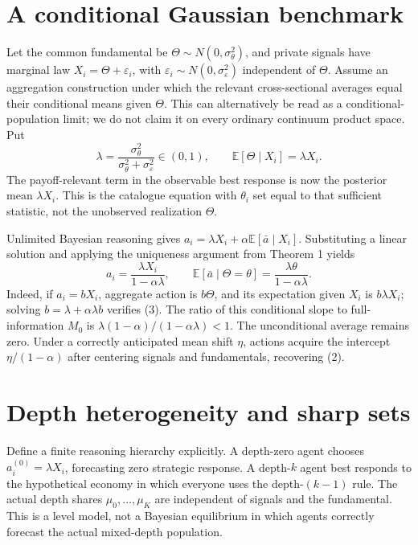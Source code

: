 \documentclass[11pt]{article}
\theoremstyle{remark}
\newcommand{\E}{\mathbb E}
\begin{document}
\section{A conditional Gaussian benchmark}
Let the common fundamental be $\Theta\sim N(0,\sigma_\theta^2)$, and private signals have marginal law $X_i=\Theta+\varepsilon_i$, with $\varepsilon_i\sim N(0,\sigma_\varepsilon^2)$ independent of $\Theta$. Assume an aggregation construction under which the relevant cross-sectional averages equal their conditional means given $\Theta$. This can alternatively be read as a conditional-population limit; we do not claim it on every ordinary continuum product space. Put
\[
 \lambda=\frac{\sigma_\theta^2}{\sigma_\theta^2+\sigma_\varepsilon^2}\in(0,1),
 \qquad \E[\Theta\mid X_i]=\lambda X_i.
\]
The payoff-relevant term in the observable best response is now the posterior mean $\lambda X_i$. This is the catalogue equation with $\theta_i$ set equal to that sufficient statistic, not the unobserved realization $\Theta$.

Unlimited Bayesian reasoning gives $a_i=\lambda X_i+\alpha\E[\bar a\mid X_i]$. Substituting a linear solution and applying the uniqueness argument from Theorem 1 yields
\[
 a_i=\frac{\lambda X_i}{1-\alpha\lambda},\qquad
 \E[\bar a\mid\Theta=\theta]=\frac{\lambda\theta}{1-\alpha\lambda}. \tag{3}
\]
Indeed, if $a_i=bX_i$, aggregate action is $b\Theta$, and its expectation given $X_i$ is $b\lambda X_i$; solving $b=\lambda+\alpha\lambda b$ verifies (3). The ratio of this conditional slope to full-information $M_0$ is $\lambda(1-\alpha)/(1-\alpha\lambda)<1$. The unconditional average remains zero. Under a correctly anticipated mean shift $\eta$, actions acquire the intercept $\eta/(1-\alpha)$ after centering signals and fundamentals, recovering (2).

\section{Depth heterogeneity and sharp sets}
Define a finite reasoning hierarchy explicitly. A depth-zero agent chooses $a_i^{(0)}=\lambda X_i$, forecasting zero strategic response. A depth-$k$ agent best responds to the hypothetical economy in which everyone uses the depth-$(k-1)$ rule. The actual depth shares $\mu_0,\ldots,\mu_K$ are independent of signals and the fundamental. This is a level model, not a Bayesian equilibrium in which agents correctly forecast the actual mixed-depth population.
\end{document}
